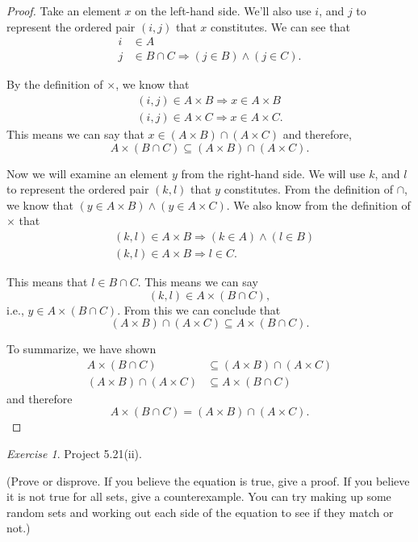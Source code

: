 \documentclass[12pt,oneside]{amsart}
\theoremstyle{remark}
\newtheorem{exer}{Exercise}
\begin{document}
\begin{proof}
Take an element $x$ on the left-hand side. We'll also use $i$, and $j$ to represent the ordered pair $(i, j)$ that $x$ constitutes. We can see that
\begin{align*}
i &\in A \tag{definition of $\times$} \\
j &\in B \cap C \Rightarrow (j \in B) \wedge (j \in C). \tag{definition of $\cap$}
\end{align*}

By the definition of $\times$, we know that
\begin{align*}
(i, j) \in A \times B \Rightarrow x \in A \times B \\
(i, j) \in A \times C \Rightarrow x \in A \times C.
\end{align*} This means we can say that $x \in (A \times B) \cap (A \times C)$ and therefore, \[ A \times (B \cap C) \subseteq (A \times B) \cap (A \times C). \]

Now we will examine an element $y$ from the right-hand side. We will use $k$, and $l$ to represent the ordered pair $(k, l)$ that $y$ constitutes. From the definition of $\cap$, we know that $(y \in A \times B) \wedge (y \in A \times C)$. We also know from the definition of $\times$ that
\begin{align*}
&(k, l) \in A \times B \Rightarrow (k \in A) \wedge (l \in B) \\
&(k, l) \in A \times B \Rightarrow l \in C.
\end{align*}

This means that $l \in B \cap C$. This means we can say \[ (k, l) \in A \times (B \cap C), \] i.e., $y \in A \times (B \cap C)$. From this we can conclude that \[ (A \times B) \cap (A \times C) \subseteq A \times (B \cap C). \]

To summarize, we have shown
\begin{align*}
A \times (B \cap C) &\subseteq (A \times B) \cap (A \times C) \\
(A \times B) \cap (A \times C) &\subseteq A \times (B \cap C)
\end{align*} and therefore \[ A \times (B \cap C) = (A \times B) \cap (A \times C). \]
\end{proof}

%
%
%
%
\newpage
\begin{exer}
Project 5.21(ii).

(Prove or disprove. If you believe the equation is true, give a proof. If you believe it is not true for all sets, give a counterexample. You can try making up some random sets and working out each side of the equation to see if they match or not.)
\end{exer}
\end{document}
